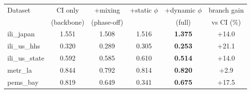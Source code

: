 \begin{tabular}{lccccc}
\toprule
Dataset & CI only & +mixing & +static $\phi$ & +dynamic $\phi$ & branch gain \\
& (backbone) & (phase-off) & & (full) & vs CI (\%) \\
\midrule
ili\_japan & 1.551 & 1.508 & 1.516 & \textbf{1.375} & +14.0 \\
ili\_us\_hhs & 0.320 & 0.289 & 0.305 & \textbf{0.253} & +21.1 \\
ili\_us\_state & 0.592 & 0.585 & 0.610 & \textbf{0.514} & +14.0 \\
metr\_la & 0.844 & 0.792 & 0.814 & \textbf{0.820} & +2.9 \\
pems\_bay & 0.819 & 0.649 & 0.341 & \textbf{0.675} & +17.5 \\
\bottomrule
\end{tabular}
